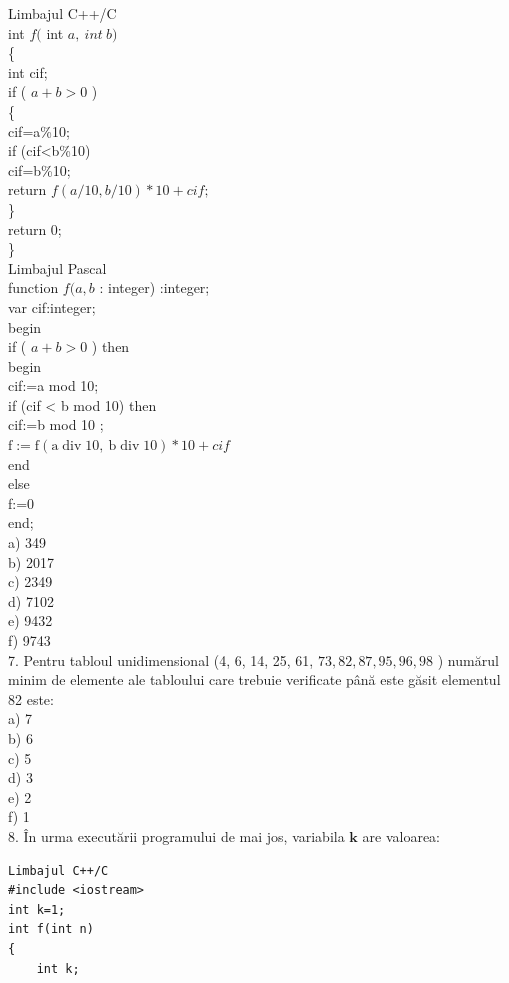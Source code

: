 \documentclass[10pt]{article}
\begin{document}
Limbajul C++/C\\
int $f($ int $a, ~ i n t ~ b) ~$\\
\{\\
int cif;\\
if ( $a+b>0$ )\\
\{\\
cif=a\%10;\\
if (cif<b\%10)\\
cif=b\%10;\\
return $f(a / 10, b / 10) * 10+c i f ;$\\
\}\\
return 0;\\
\}\\
Limbajul Pascal\\
function $f(a, b$ : integer) :integer;\\
var cif:integer;\\
begin\\
if ( $a+b>0$ ) then\\
begin\\
cif:=a mod 10;\\
if (cif < b mod 10) then\\
cif:=b mod 10 ;\\
$\mathrm{f}:=\mathrm{f}(\mathrm{a} \operatorname{div} 10, \mathrm{~b} \operatorname{div} 10) * 10+c i f$\\
end\\
else\\
f:=0\\
end;\\
a) 349\\
b) 2017\\
c) 2349\\
d) 7102\\
e) 9432\\
f) 9743\\
7. Pentru tabloul unidimensional (4, 6, 14, 25, 61, $73,82,87,95,96,98$ ) numărul minim de elemente ale tabloului care trebuie verificate până este găsit elementul 82 este:\\
a) 7\\
b) 6\\
c) 5\\
d) 3\\
e) 2\\
f) 1\\
8. În urma executării programului de mai jos, variabila $\mathbf{k}$ are valoarea:

\begin{verbatim}
Limbajul C++/C
#include <iostream>
int k=1;
int f(int n)
{
    int k;
\end{verbatim}
\end{document}
